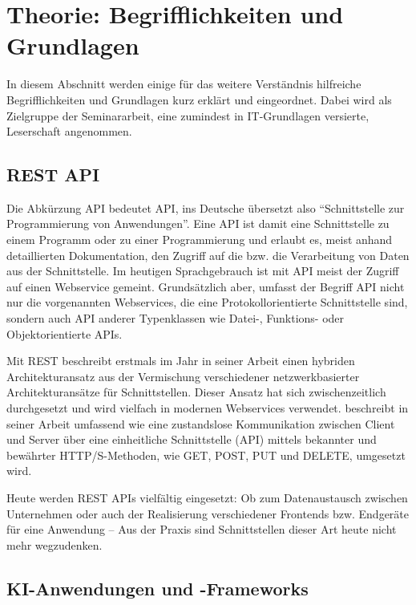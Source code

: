 \documentclass[12pt,oneside,titlepage,listof=totoc,bibliography=totoc]{scrartcl}
\begin{document}
\newpage
\section{Theorie: Begrifflichkeiten und Grundlagen}

In diesem Abschnitt werden einige für das weitere Verständnis hilfreiche Begrifflichkeiten und Grundlagen kurz erklärt und eingeordnet. Dabei wird als Zielgruppe der Seminararbeit, eine zumindest in IT-Grundlagen versierte, Leserschaft angenommen.


\subsection{REST API}

Die Abkürzung \acs{API} bedeutet \acl{API}, ins Deutsche übersetzt also \enquote{Schnittstelle zur Programmierung von Anwendungen}. Eine API ist damit eine Schnittstelle zu einem Programm oder zu einer Programmierung und erlaubt es, meist anhand detaillierten Dokumentation, den Zugriff auf die  bzw. die Verarbeitung von Daten aus der Schnittstelle. Im heutigen Sprachgebrauch ist mit API  meist der Zugriff auf einen Webservice gemeint. Grundsätzlich aber, umfasst der Begriff API nicht nur die vorgenannten Webservices, die eine Protokollorientierte Schnittstelle sind, sondern auch API anderer Typenklassen wie Datei-, Funktions- oder Objektorientierte APIs.

Mit \ac{REST} beschreibt \citeauthor[]{51-fielding-rest} erstmals im Jahr \citeyear[]{51-fielding-rest} in seiner Arbeit  einen hybriden Architekturansatz aus der Vermischung verschiedener netzwerkbasierter Architekturansätze für Schnittstellen. Dieser Ansatz hat sich zwischenzeitlich durchgesetzt und wird vielfach in modernen Webservices verwendet. \citeauthor[]{51-fielding-rest} beschreibt in seiner Arbeit umfassend wie eine zustandslose Kommunikation zwischen Client und Server über eine einheitliche Schnittstelle (API) mittels bekannter und bewährter \ac{HTTP/S}-Methoden, wie GET, POST, PUT und DELETE, umgesetzt wird.

Heute werden REST APIs vielfältig eingesetzt: Ob zum Datenaustausch zwischen Unternehmen oder auch der Realisierung verschiedener Frontends bzw. Endgeräte für eine Anwendung -- Aus der Praxis sind Schnittstellen dieser Art heute nicht mehr wegzudenken. 

\subsection{KI-Anwendungen und -Frameworks}
\end{document}
